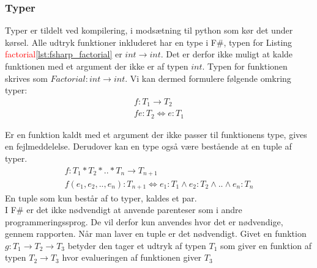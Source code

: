 

\subsubsection{Typer}
Typer er tildelt ved kompilering, i modsætning til python som kør det under kørsel. Alle udtryk funktioner inkluderet har en type i F\#, typen for Listing \textcolor{red}{factorial}\ref{lst:fsharp_factorial} er $int \rightarrow int$. Det er derfor ikke muligt at kalde funktionen med et argument der ikke er af typen $int$. Typen for funktionen skrives som $Factorial: int \rightarrow int$. Vi kan dermed formulere følgende omkring typer:
\begin{gather*}
    f: T_1 \rightarrow T_2 \\
    f e : T_2 \iff e : T_1
\end{gather*}

Er en funktion kaldt med et argument der ikke passer til funktionens type, gives en fejlmeddelelse. Derudover kan en type også være bestående at en tuple af typer.
\begin{gather*}
    f: T_1 * T_2 * .. * T_n \rightarrow T_{n+1}\\
    f (e_1, e_2, .., e_n) :T_{n+1} \iff e_1 : T_1 \land e_2 : T_2 \land .. \land e_n : T_n
\end{gather*}
En tuple som kun består af to typer, kaldes et par. \\I F\# er det ikke nødvendigt at anvende parenteser som i andre programmeringssprog. De vil derfor kun anvendes hvor det er nødvendige, gennem rapporten. Når man laver en tuple er det nødvendigt.
Givet en funktion $g: T_1 \rightarrow T_2 \rightarrow T_3$ betyder den tager et udtryk af typen $T_1$ som giver en funktion af typen $T_2 \rightarrow T_3$ hvor evalueringen af funktionen giver $T_3$
 
